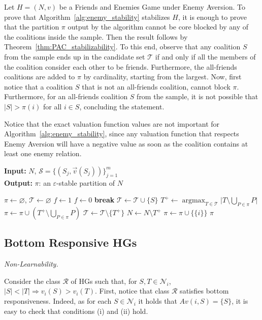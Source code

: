 \documentclass[letterpaper]{article} %
\makeatletter
\DeclareMathOperator{\argmax}{argmax}
\newcommand{\set}[1]{\{#1\}}
\newcommand{\modulus}[1]{\vert #1 \vert}
\newcommand{\proofpart}[1]{%
  \par
  \addvspace{\smallskipamount}%
  \noindent\emph{#1} \hspace{2pt}
}
\makeatother
\begin{document}
Let $H=(N,v)$ be a Friends and Enemies Game under Enemy Aversion. To prove that Algorithm~\ref{alg:enemy_stability} stabilizes $H$, it is enough to prove that the partition $\pi$ output by the algorithm cannot be core blocked by any of the coalitions inside the sample. Then the result follows by Theorem~\ref{thm:PAC_stabilizability}. To this end, observe that any coalition $S$ from the sample ends up in the candidate set $\mathcal{T}$ if and only if all the members of the coalition consider each other to be friends. Furthermore, the all-friends coalitions are added to $\pi$ by cardinality, starting from the largest. Now, first notice that a coalition $S$ that is not an all-friends coalition, cannot block $\pi$. Furthermore, for an all-friends coalition $S$ from the sample, it is not possible that $|S|>\pi(i)$ for all $i\in S$, concluding the statement.

Notice that the exact valuation function values are not important for Algorithm~\ref{alg:enemy_stability}, since any valuation function that respects Enemy Aversion will have a negative value as soon as the coalition contains at least one enemy relation.
\begin{algorithm}[htb]
\caption{Stabilizing Enemy Aversion}\label{alg:enemy_stability}
\textbf{Input:} $N$, $\mathcal{S}=\{( S_j,\vec{v}(S_j))\}_{j=1}^m$\\
\textbf{Output:} $\pi$: an $\varepsilon$-stable partition of $N$

\begin{algorithmic}[1]
\STATE $\pi \gets \varnothing$, $\mathcal{T} \gets \varnothing$
      \STATE $f \gets 1$
    \STATE $f \gets 0$
    \STATE \textbf{break}
    \ENDIF
     \STATE $\mathcal{T} \gets \mathcal{T} \cup \{S\}$
     \ENDIF
\ENDFOR
{}
    \STATE $T^+ \gets \argmax_{T \in \mathcal{T}}{\modulus{T \setminus \bigcup_{P \in \pi} P}}$
    \STATE $\pi \gets \pi \cup \left(T^+ \setminus \bigcup_{P \in \pi} P \right)$
    \STATE $\mathcal{T} \gets \mathcal{T} \setminus \set{T^+}$
    \STATE $N \gets N \setminus T^+$
\ENDWHILE    
    \STATE $\pi \gets \pi \cup \{\set{i}\}$
    \ENDFOR
    \RETURN $\pi$
\end{algorithmic}
\end{algorithm}

\subsection{Bottom Responsive HGs}
\proofpart{Non-Learnability.}
Consider the class $\mathcal{R}$ of HGs such that, for $S, T \in \mathcal{N}_i$, $|S| < |T| \Rightarrow v_i(S) > v_i(T)$.
%
First, notice that class $\mathcal{R}$ satisfies bottom responsiveness. Indeed, as for each $S \in \mathcal{N}_i$ it holds that $Av(i, S) = \{S\}$, it is easy to check that conditions (i) and (ii) hold.
%
\end{document}
